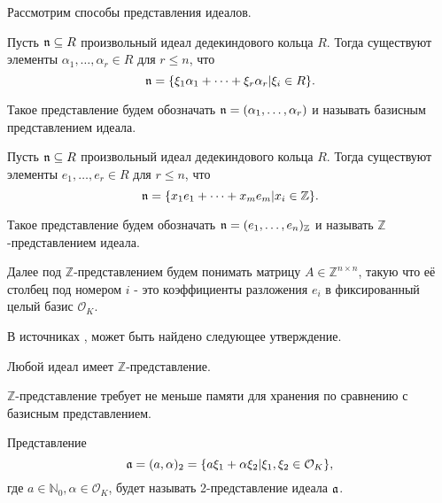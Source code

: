 \documentclass[_00_dissertation.tex]{subfiles}
\begin{document}
Рассмотрим способы представления идеалов.

\begin{definition}
    Пусть $\mathfrak{n} \subseteq R$ произвольный идеал дедекиндового кольца $R$.
    Тогда существуют элементы $\alpha_1, \dots, \alpha_r \in R$ для $r \leq n$, что
    \begin{equation*}
        \mathfrak{n} = \{\xi_1 \alpha_1 + \dots + \xi_r \alpha_r | \xi_i \in R\}.
    \end{equation*}
    
    Такое представление будем обозначать $\mathfrak{n} = (\alpha_1, \dots, \alpha_r)$ и называть базисным представлением идеала.
\end{definition}

\begin{definition}
    Пусть $\mathfrak{n} \subseteq R$ произвольный идеал дедекиндового кольца $R$.
    Тогда существуют элементы $e_1, \dots, e_r \in R$ для $r \leq n$, что
    \begin{equation*}
        \mathfrak{n} = \{x_1 e_1 + \dots + x_m e_m | x_i \in \mathbb{Z}\}.
    \end{equation*}

    Такое представление будем обозначать $\mathfrak{n} = (e_1, \dots, e_n)_{\mathbb{Z}}$ и называть $\mathbb{Z}$-представлением идеала.
\end{definition}

Далее под $\mathbb{Z}$-представлением будем понимать матрицу $A \in \mathbb{\mathbb{Z}}^{n \times n}$, такую что её столбец под номером $i$ - это коэффициенты разложения $e_i$ в фиксированный целый базис $\mathcal{O}_K$.

В источниках \cite{source:Cohen}, \cite{source:Post} может быть найдено следующее утверждение.

\begin{statement}
    Любой идеал имеет $\mathbb{Z}$-представление.
\end{statement}

$\mathbb{Z}$-представление требует не меньше памяти для хранения по сравнению с базисным представлением.

\begin{definition}
    Представление 
    \begin{equation}
        \mathfrak{a} = (a, \alpha)_2 = \{a\xi_1 + \alpha \xi_2 | \xi_1, \xi_2 \in \mathcal{O}_K\},
    \end{equation}
    где $a \in \mathbb{N}_0, \alpha \in \mathcal{O}_K$, будет называть 2-представление идеала $\mathfrak{a}$.
\end{definition}
\end{document}

